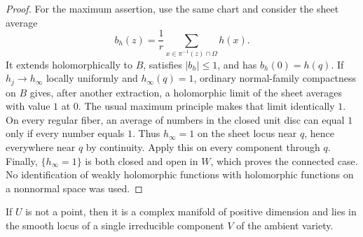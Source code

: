 \begin{proof}
For the maximum assertion, use the same chart and consider the sheet
average
\[
  b_h(z)=\frac1r\sum_{x\in\pi^{-1}(z)\cap\Omega}h(x).
\]
It extends holomorphically to $B$, satisfies $|b_h|\leq1$, and has
$b_h(0)=h(q)$.  If $h_j\to h_\infty$ locally uniformly and
$h_\infty(q)=1$, ordinary normal-family compactness on $B$ gives, after
another extraction, a holomorphic limit of the sheet averages with value
$1$ at $0$.  The usual
maximum principle makes that limit identically $1$.  On every regular fiber,
an average of numbers in the closed unit disc can equal $1$ only if every
number equals $1$.  Thus $h_\infty=1$ on the sheet locus near $q$, hence
everywhere near $q$ by continuity.  Apply this on every component through
$q$.  Finally, $\{h_\infty=1\}$ is both closed and open in $W$, which proves
the connected case.  No identification of weakly holomorphic functions
with holomorphic functions on a nonnormal space was used.
\end{proof}

\begin{proposition}\label{prop:smoothness}
If $U$ is not a point, then it is a complex manifold of positive dimension
and lies in the smooth locus of a single irreducible component $V$ of the
ambient variety.
\end{proposition}


